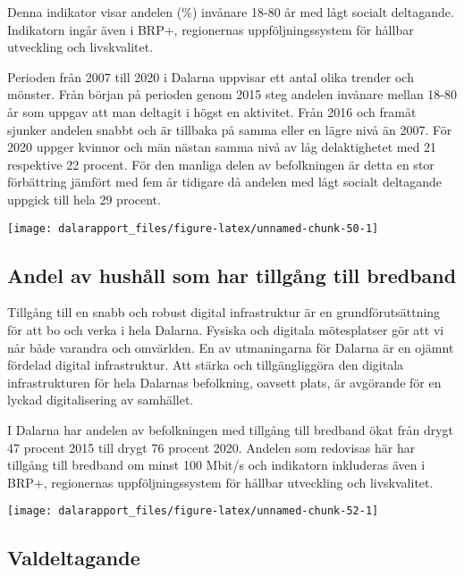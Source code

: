 \documentclass[
]{article}
\begin{document}
Denna indikator visar andelen (\%) invånare 18-80 år med lågt socialt
deltagande. Indikatorn ingår även i BRP+, regionernas uppföljningssystem
för hållbar utveckling och livskvalitet.

Perioden från 2007 till 2020 i Dalarna uppvisar ett antal olika trender
och mönster. Från början på perioden genom 2015 steg andelen invånare
mellan 18-80 år som uppgav att man deltagit i högst en aktivitet. Från
2016 och framåt sjunker andelen snabbt och är tillbaka på samma eller en
lägre nivå än 2007. För 2020 uppger kvinnor och män nästan samma nivå av
låg delaktighetet med 21 respektive 22 procent. För den manliga delen av
befolkningen är detta en stor förbättring jämfört med fem år tidigare då
andelen med lågt socialt deltagande uppgick till hela 29 procent.

\begin{center}\texttt{[image: dalarapport\_files/figure-latex/unnamed-chunk-50-1]} \end{center}

\hypertarget{andel-av-hushuxe5ll-som-har-tillguxe5ng-till-bredband}{%
\subsection{Andel av hushåll som har tillgång till
bredband}\label{andel-av-hushuxe5ll-som-har-tillguxe5ng-till-bredband}}

Tillgång till en snabb och robust digital infrastruktur är en
grundförutsättning för att bo och verka i hela Dalarna. Fysiska och
digitala mötesplatser gör att vi når både varandra och omvärlden. En av
utmaningarna för Dalarna är en ojämnt fördelad digital infrastruktur.
Att stärka och tillgängliggöra den digitala infrastrukturen för hela
Dalarnas befolkning, oavsett plats, är avgörande för en lyckad
digitalisering av samhället.

I Dalarna har andelen av befolkningen med tillgång till bredband ökat
från drygt 47 procent 2015 till drygt 76 procent 2020. Andelen som
redovisas här har tillgång till bredband om minst 100 Mbit/s och
indikatorn inkluderas även i BRP+, regionernas uppföljningssystem för
hållbar utveckling och livskvalitet.

\begin{center}\texttt{[image: dalarapport\_files/figure-latex/unnamed-chunk-52-1]} \end{center}

\hypertarget{valdeltagande}{%
\subsection{Valdeltagande}\label{valdeltagande}}
\end{document}
